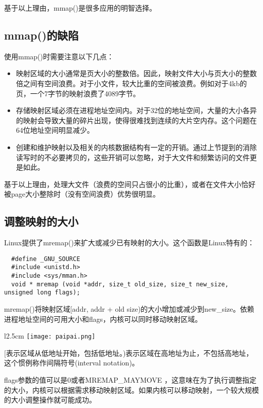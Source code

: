 基于以上理由，mmap()是很多应用的明智选择。

\subsection{mmap()的缺陷}

使用mmap()时需要注意以下几点：

\begin{itemize}
\item 映射区域的大小通常是页大小的整数倍。因此，映射文件大小与页大小的整数倍之间有空间浪费。对于小文件，较大比重的空间被浪费。例如对于4kb的页，一个7字节的映射浪费了4089字节。
\item 存储映射区域必须在进程地址空间内。对于32位的地址空间，大量的大小各异的映射会导致大量的碎片出现，使得很难找到连续的大片空内存。这个问题在64位地址空间明显减少。
\item 创建和维护映射以及相关的内核数据结构有一定的开销。通过上节提到的消除读写时的不必要拷贝的，这些开销可以忽略，对于大文件和频繁访问的文件更是如此。
\end{itemize}

基于以上理由，处理大文件（浪费的空间只占很小的比重），或者在文件大小恰好被page大小整除时（没有空间浪费）优势很明显。

\subsection{调整映射的大小}

Linux提供了mremap()来扩大或减少已有映射的大小。这个函数是Linux特有的：

\begin{lstlisting}
  #define _GNU_SOURCE
  #include <unistd.h>
  #include <sys/mman.h>
  void * mremap (void *addr, size_t old_size, size_t new_size, unsigned long flags);
\end{lstlisting}

mremap()将映射区域[addr, addr + old size)的大小增加或减少到new\_size。依赖进程地址空间的可用大小和flags，内核可以同时移动映射区域。

\begin{wrapfigure}{l}{2.5cm}
  \texttt{[image: paipai.png]}
\end{wrapfigure}
\mbox{}[表示区域从低地址开始，包括低地址。)表示区域在高地址为止，不包括高地址，这个惯例称作间隔符号(interval notation)。

flags参数的值可以是0或者MREMAP\_MAYMOVE ，这意味在为了执行调整指定的大小，内核可以根据需求移动映射区域。如果内核可以移动映射，一个较大规模的大小调整操作就可能成功。

